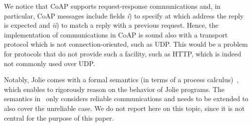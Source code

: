 We notice that CoAP supports request-response communications and, in particular,
CoAP messages include fields \emph{i}) to specify at which address the reply is
expected and \emph{ii}) to match a reply with a previous request. Hence, the
implementation of  communications in CoAP is sound
also with a transport protocol which is not connection-oriented, such as UDP.\@
This would be a problem for protocols that do not provide such a facility, such
as HTTP, which is indeed not commonly used over UDP.

Notably, Jolie comes with a formal semantics (in terms of a process
calculus)~\cite{Guidi2006}, which enables to rigorously reason on the behavior
of Jolie programs. 
The semantics in~\cite{Guidi2006} only considers reliable communications and
needs to be extended to also cover the unreliable case. We do not report here on
this topic, since it is not central for the purpose of this paper.
